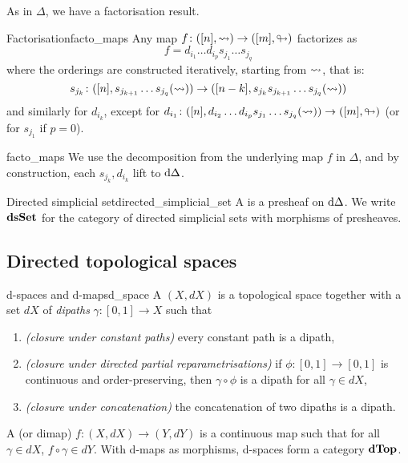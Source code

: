 As in \( \Delta \), we have a factorisation result.
\begin{clem}{Factorisation}{facto_maps}
    Any map \( f\colon ([n], \rightsquigarrow) \to ([m], \looparrowright) \) factorizes as 
    \begin{equation*}
    	f = d_{i_1}\dots d_{i_p}s_{j_1}\dots s_{j_q}
    \end{equation*}
    where the orderings are constructed iteratively, starting from \( \rightsquigarrow \), that is:
    \begin{equation*}
        s_{j_k}\colon ([n], s_{j_{k+1}}\dots s_{j_q}(\rightsquigarrow)) \to ([n - k], s_{j_k}s_{j_{k+1}}\dots s_{j_q}(\rightsquigarrow)) 
    \end{equation*}
    and similarly for \( d_{i_k} \), except for \( d_{i_1}\colon ([n], d_{i_2}\dots d_{i_p}s_{j_1}\dots s_{j_q}(\rightsquigarrow)) \to ([m], \looparrowright) \) (or for \( s_{j_1} \) if \( p = 0 \)).
\end{clem} 
\begin{lemproof}{facto_maps}
    We use the decomposition from the underlying map \( f \) in \( \Delta \), and by construction, each \( s_{j_k}, d_{i_k} \) lift to \( \mathrm{d}\Delta \).
\end{lemproof}

\begin{cdef}{Directed simplicial set}{directed_simplicial_set}
	A  is a presheaf on \( \mathrm{d}\Delta \).
	We write \( \mathbf{dsSet} \) for the category of directed simplicial sets with morphisms of presheaves.
\end{cdef}


\subsection{Directed topological spaces}

\begin{cdef}{d-spaces and d-maps}{d_space}
	A  \( (X, dX) \) is a topological space together with a set \( dX \) of \emph{dipaths} \( \gamma\colon [0, 1] \to X \) such that
    \begin{enumerate}
	\item \emph{(closure under constant paths)} every constant path is a dipath,
	\item \emph{(closure under directed partial reparametrisations)}
		if \( \phi\colon [0, 1] \to [0, 1] \) is continuous and order-preserving, then \( \gamma \circ \phi \) is a dipath for all \( \gamma \in dX \),
	\item \emph{(closure under concatenation)} the concatenation of two dipaths is a dipath.
    \end{enumerate}
    A  (or dimap) \( f\colon (X, dX) \to (Y, dY) \) is a continuous map such that for all \( \gamma \in dX \), \( f \circ \gamma \in dY \).
    With d-maps as morphisms, d-spaces form a category \( \mathbf{dTop} \).
\end{cdef}

